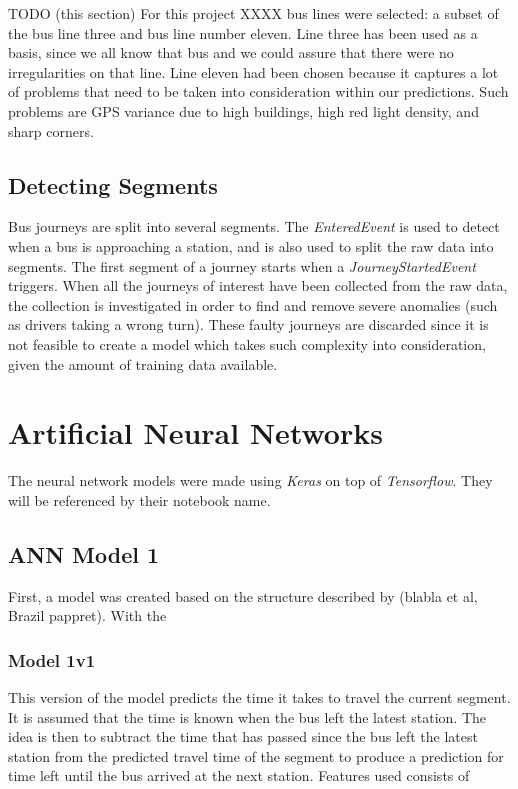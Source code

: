 TODO (this section) For this project XXXX bus lines were selected: a subset of the bus line three and bus line number eleven. Line three has been used as a basis, since we all know that bus and we could assure that there were no irregularities on that line. Line eleven had been chosen because it captures a lot of problems that need to be taken into consideration within our predictions. Such problems are GPS variance due to high buildings, high red light density, and sharp corners. 

\subsection{Detecting Segments}
Bus journeys are split into several segments. The \textit{EnteredEvent} is used to detect when a bus is approaching a station, and is also used to split the raw data into segments. The first segment of a journey starts when a \textit{JourneyStartedEvent} triggers. When all the journeys of interest have been collected from the raw data, the collection is investigated in order to find and remove severe anomalies (such as drivers taking a wrong turn). These faulty journeys are discarded since it is not feasible to create a model which takes such complexity into consideration, given the amount of training data available.

\section{Artificial Neural Networks}
The neural network models were made using \textit{Keras} on top of \textit{Tensorflow}. They will be referenced by their notebook name.

\subsection{ANN Model 1}
First, a model was created based on the structure described by (blabla et al, Brazil pappret). With the 

\subsubsection{Model 1v1}
This version of the model predicts the time it takes to travel the current segment. It is assumed that the time is known when the bus left the latest station. The idea is then to subtract the time that has passed since the bus left the latest station from the predicted travel time of the segment to produce a prediction for time left until the bus arrived at the next station.
Features used consists of

